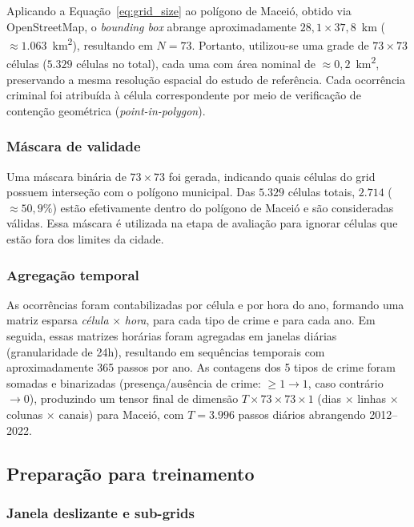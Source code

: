 Aplicando a Equação~\ref{eq:grid_size} ao polígono de Maceió, obtido via OpenStreetMap, o \textit{bounding box} abrange aproximadamente $28{,}1 \times 37{,}8$~km ($\approx 1.063$~km\textsuperscript{2}), resultando em $N = 73$. Portanto, utilizou-se uma grade de $73 \times 73$ células ($5.329$ células no total), cada uma com área nominal de $\approx 0{,}2$~km\textsuperscript{2}, preservando a mesma resolução espacial do estudo de referência. Cada ocorrência criminal foi atribuída à célula correspondente por meio de verificação de contenção geométrica (\textit{point-in-polygon}).

\subsubsection{Máscara de validade}

Uma máscara binária de $73 \times 73$ foi gerada, indicando quais células do grid possuem interseção com o polígono municipal. Das $5.329$ células totais, $2.714$ ($\approx 50{,}9\%$) estão efetivamente dentro do polígono de Maceió e são consideradas válidas. Essa máscara é utilizada na etapa de avaliação para ignorar células que estão fora dos limites da cidade.

\subsubsection{Agregação temporal}

As ocorrências foram contabilizadas por célula e por hora do ano, formando uma matriz esparsa \textit{célula} $\times$ \textit{hora}, para cada tipo de crime e para cada ano. Em seguida, essas matrizes horárias foram agregadas em janelas diárias (granularidade de 24h), resultando em sequências temporais com aproximadamente 365 passos por ano. As contagens dos 5 tipos de crime foram somadas e binarizadas (presença/ausência de crime: $\geq 1 \rightarrow 1$, caso contrário $\rightarrow 0$), produzindo um tensor final de dimensão $T \times 73 \times 73 \times 1$ (dias $\times$ linhas $\times$ colunas $\times$ canais) para Maceió, com $T = 3.996$ passos diários abrangendo 2012--2022.

\subsection{Preparação para treinamento}
\label{Sec:preparacao}

\subsubsection{Janela deslizante e sub-grids}

